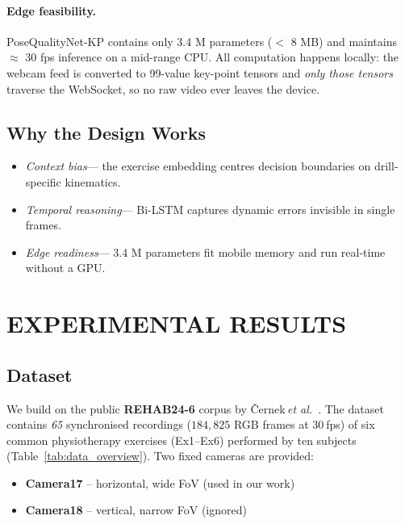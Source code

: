 \documentclass{article}
\begin{document}
\paragraph{Edge feasibility.}
PoseQualityNet-KP contains only 3.4 M parameters ($<$ 8 MB) and maintains
$\approx$ 30 fps inference on a mid-range CPU.  All computation happens
locally: the webcam feed is converted to 99-value key-point tensors and
\emph{only those tensors} traverse the WebSocket, so no raw video ever
leaves the device.

\subsection{Why the Design Works}
\begin{itemize}[leftmargin=1.35em]
  \item \emph{Context bias}\;— the exercise embedding centres decision
        boundaries on drill-specific kinematics.
  \item \emph{Temporal reasoning}\;— Bi-LSTM captures dynamic errors
        invisible in single frames.
  \item \emph{Edge readiness}\;— 3.4 M parameters fit mobile memory and
        run real-time without a GPU.
\end{itemize}

\section{EXPERIMENTAL RESULTS}

\subsection{Dataset}
\label{sec:data}

We build on the public \textbf{REHAB24-6} corpus by
Černek\,\textit{et al.}~\cite{cernek2024rehab24}.  
The dataset contains \emph{65} synchronised recordings  
($184{,}825$ RGB frames at 30 fps) of six common physiotherapy
exercises (Ex1–Ex6) performed by ten subjects
(Table~\ref{tab:data_overview}).  
Two fixed cameras are provided:

\begin{itemize}
  \item \textbf{Camera17} – horizontal, wide FoV (used in our work)
  \item \textbf{Camera18} – vertical, narrow FoV (ignored)
\end{itemize}
\end{document}
